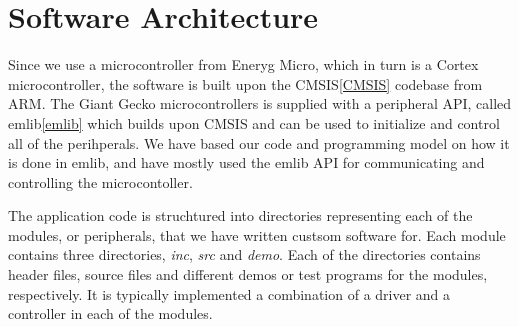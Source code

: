 \section{Software Architecture}

Since we use a microcontroller from Eneryg Micro, which in turn is a
Cortex microcontroller, the software is built upon the CMSIS\ref{CMSIS} codebase
from ARM.
The Giant Gecko microcontrollers is supplied with a peripheral API,
called emlib\ref{emlib} which builds upon CMSIS and can be used to initialize and 
control all of the perihperals.
We have based our code and programming model on how it is done in emlib, 
and have mostly used the emlib API for communicating and controlling the
microcontoller.

The application code is struchtured into directories representing each of
the modules, or peripherals, that we have written custsom software for.
Each module contains three directories, \textit{inc}, \textit{src} and
\textit{demo}. Each of the directories contains header files, source files
and different demos or test programs for the modules, respectively. 
It is typically implemented a combination of a driver and a controller
in each of the modules.